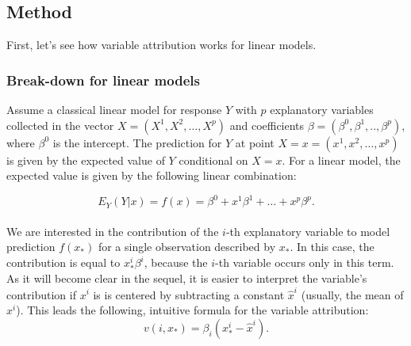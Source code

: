\documentclass[12pt,]{krantz}
\begin{document}
\hypertarget{BDMethod}{%
\subsection{Method}\label{BDMethod}}

First, let's see how variable attribution works for linear models.

\hypertarget{break-down-for-linear-models}{%
\subsubsection{Break-down for linear models}\label{break-down-for-linear-models}}

Assume a classical linear model for response \(Y\) with \(p\) explanatory variables collected in the vector \(X = (X^1, X^2, \ldots, X^p)\) and coefficients \(\beta = (\beta^0, \beta^1, .., \beta^p)\), where \(\beta^0\) is the intercept. The prediction for \(Y\) at point \(X=x=(x^1, x^2, \ldots, x^p)\) is given by the expected value of \(Y\) conditional on \(X=x\). For a linear model, the expected value is given by the following linear combination:

\[
E_Y(Y | x) = f(x) = \beta^0 + x^1 \beta^1 + \ldots + x^p \beta^p.
\]\\
We are interested in the contribution of the \(i\)-th explanatory variable to model prediction \(f(x_*)\) for a single observation described by \(x_*\). In this case, the contribution is equal to \(x_*^i\beta^i\), because the \(i\)-th variable occurs only in this term. As it will become clear in the sequel, it is easier to interpret the variable's contribution if \(x^i\) is is centered by subtracting a constant \(\hat x^i\) (usually, the mean of \(x^i\)). This leads the following, intuitive formula for the variable attribution:
\[
v(i, x_*) = \beta_i (x^i_* - \hat x^i).
\]
\end{document}
